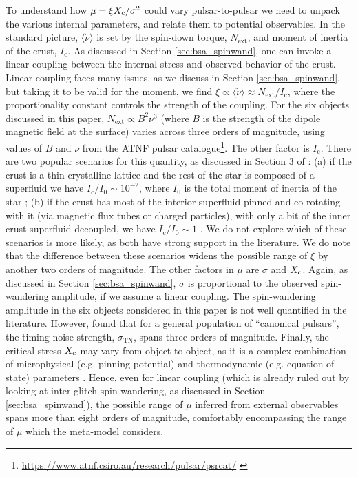 To understand how $\mu = \xi X_\textrm{c} / \sigma^2$ could vary pulsar-to-pulsar we need to unpack the various internal parameters, and relate them to potential observables. In the standard picture, $\langle \dot{\nu} \rangle$ is set by the spin-down torque, $N_\textrm{ext}$, and moment of inertia of the crust, $I_\textrm{c}$. As discussed in Section \ref{sec:bsa_spinwand}, one can invoke a linear coupling between the internal stress and observed behavior of the crust. Linear coupling faces many issues, as we discuss in Section \ref{sec:bsa_spinwand}, but taking it to be valid for the moment, we find $\xi \propto \langle\dot{\nu}\rangle \approx N_\textrm{ext} / I_\textrm{c}$, where the proportionality constant controls the strength of the coupling. For the six objects discussed in this paper, $N_\textrm{ext} \propto B^2 \nu^3$ (where $B$ is the strength of the dipole magnetic field at the surface) varies across three orders of magnitude, using values of $B$ and $\nu$ from the ATNF pulsar catalogue\footnote{\url{https://www.atnf.csiro.au/research/pulsar/psrcat/} \citep{Manchester2005}}. The other factor is $I_\textrm{c}$. There are two popular scenarios for this quantity, as discussed in Section 3 of \citet{Melatos2015}: (a) if the crust is a thin crystalline lattice and the rest of the star is composed of a superfluid we have $I_\textrm{c} / I_0 \sim 10^{-2}$, where $I_0$ is the total moment of inertia of the star \citep{Andersson2012, Hooker2015}; (b) if the crust has most of the interior superfluid pinned and co-rotating with it (via magnetic flux tubes or charged particles), with only a bit of the inner crust superfluid decoupled, we have $I_\textrm{c} / I_0 \sim 1$ \citep{Link1999a, Lyne2000a, Espinoza2011}. We do not explore which of these scenarios is more likely, as both have strong support in the literature. We do note that the difference between these scenarios widens the possible range of $\xi$ by another two orders of magnitude. The other factors in $\mu$ are $\sigma$ and $X_\textrm{c}$. Again, as discussed in Section \ref{sec:bsa_spinwand}, $\sigma$ is proportional to the observed spin-wandering amplitude, if we assume a linear coupling. The spin-wandering amplitude in the six objects considered in this paper is not well quantified in the literature. However, \citet{Shannon2010} found that for a general population of ``canonical pulsars'', the timing noise strength, $\sigma_{\textrm{TN}}$, spans three orders of magnitude. Finally, the critical stress $X_\textrm{c}$ may vary from object to object, as it is a complex combination of microphysical (e.g. pinning potential)  and thermodynamic (e.g. equation of state) parameters \citep{Link1991}. Hence, even for linear coupling (which is already ruled out by looking at inter-glitch spin wandering, as discussed in Section \ref{sec:bsa_spinwand}), the possible range of $\mu$ inferred from external observables spans more than eight orders of magnitude, comfortably encompassing the range of $\mu$ which the meta-model considers.

